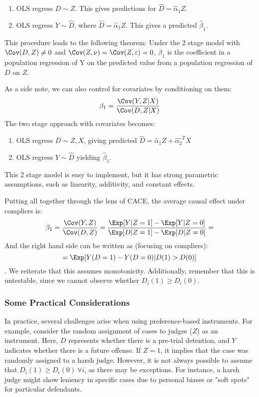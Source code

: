 \begin{enumerate}
    \item OLS regress $D \sim Z$. This gives predictions for $\hat{D} = \hat{\alpha}_1 Z$.
    \item OLS regress $Y \sim \hat{D}$, where $\hat{D} = \hat{\alpha}_1Z$. This gives a predicted $\hat{\beta}_1$.
\end{enumerate}

This procedure leads to the following theorem: Under the 2 stage model with $\Cov(D,Z) \neq 0$ and $\Cov(Z,\nu) = \Cov(Z,\varepsilon) = 0$, $\beta_1$ is the coefficient in a population regression of Y on the predicted value from a population regression of $D$ on $Z$.

As a side note, we can also control for covariates by conditioning on them:
$$\beta_1 = \frac{\Cov(Y, Z | X) }{\Cov(D, Z | X)}$$
The two stage approach with covariates becomes:
\begin{enumerate}
    \item OLS regress $D \sim Z, X$, giving predicted $\hat{D} = \hat{\alpha}_1 Z + \hat{\alpha_2}^T X$
    \item OLS regress $Y \sim \hat{D}$ yielding $\hat{\beta}_1$. 

\end{enumerate}
This 2 stage model is easy to implement, but it has strong parametric assumptions, such as linearity, additivity, and constant effects.

Putting all together through the lens of CACE, the average causal effect under compliers is:
$$\beta_1 = \frac{\Cov(Y, Z ) }{\Cov(D, Z )} = \frac{\Exp [Y | Z = 1] - \Exp [Y | Z = 0]}{\Exp [D | Z = 1] - \Exp [D | Z = 0]} = $$
And the right hand side can be written as (focusing on compliers):
$$= \Exp [Y(D=1) - Y(D=0) | D(1) > D(0)]$$.
We reiterate that this assumes monotonicity. Additionally, remember that this is untestable, since we cannot observe whether $D_i(1) \geq D_i(0)$.

\subsubsection{Some Practical Considerations}  
In practice, several challenges arise when using preference-based instruments. For example, consider the random assignment of cases to judges (\(Z\)) as an instrument. Here, \(D\) represents whether there is a pre-trial detention, and \(Y\) indicates whether there is a future offense. If \(Z = 1\), it implies that the case was randomly assigned to a harsh judge. However, it is not always possible to assume that \(D_i(1) \geq D_i(0) \ \forall i\), as there may be exceptions. For instance, a harsh judge might show leniency in specific cases due to personal biases or "soft spots" for particular defendants.  

